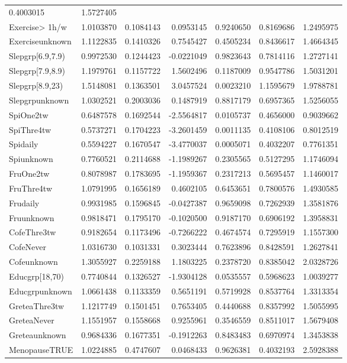 \documentclass[]{article}
\begin{document}
\begin{longtable}[]{@{}lrrrrrr@{}}
0.4003015 & 1.5727405\tabularnewline
Exercise\textgreater{} 1h/w & 1.0103870 & 0.1084143 & 0.0953145 &
0.9240650 & 0.8169686 & 1.2495975\tabularnewline
Exerciseunknown & 1.1122835 & 0.1410326 & 0.7545427 & 0.4505234 &
0.8436617 & 1.4664345\tabularnewline
Slepgrp{[}6.9,7.9) & 0.9972530 & 0.1244423 & -0.0221049 & 0.9823643 &
0.7814116 & 1.2727141\tabularnewline
Slepgrp{[}7.9,8.9) & 1.1979761 & 0.1157722 & 1.5602496 & 0.1187009 &
0.9547786 & 1.5031201\tabularnewline
Slepgrp{[}8.9,23) & 1.5148081 & 0.1363501 & 3.0457524 & 0.0023210 &
1.1595679 & 1.9788781\tabularnewline
Slepgrpunknown & 1.0302521 & 0.2003036 & 0.1487919 & 0.8817179 &
0.6957365 & 1.5256055\tabularnewline
SpiOne2tw & 0.6487578 & 0.1692544 & -2.5564817 & 0.0105737 & 0.4656000 &
0.9039662\tabularnewline
SpiThre4tw & 0.5737271 & 0.1704223 & -3.2601459 & 0.0011135 & 0.4108106
& 0.8012519\tabularnewline
Spidaily & 0.5594227 & 0.1670547 & -3.4770037 & 0.0005071 & 0.4032207 &
0.7761351\tabularnewline
Spiunknown & 0.7760521 & 0.2114688 & -1.1989267 & 0.2305565 & 0.5127295
& 1.1746094\tabularnewline
FruOne2tw & 0.8078987 & 0.1783695 & -1.1959367 & 0.2317213 & 0.5695457 &
1.1460017\tabularnewline
FruThre4tw & 1.0791995 & 0.1656189 & 0.4602105 & 0.6453651 & 0.7800576 &
1.4930585\tabularnewline
Frudaily & 0.9931985 & 0.1596845 & -0.0427387 & 0.9659098 & 0.7262939 &
1.3581876\tabularnewline
Fruunknown & 0.9818471 & 0.1795170 & -0.1020500 & 0.9187170 & 0.6906192
& 1.3958831\tabularnewline
CofeThre3tw & 0.9182654 & 0.1173496 & -0.7266222 & 0.4674574 & 0.7295919
& 1.1557300\tabularnewline
CofeNever & 1.0316730 & 0.1031331 & 0.3023444 & 0.7623896 & 0.8428591 &
1.2627841\tabularnewline
Cofeunknown & 1.3055927 & 0.2259188 & 1.1803225 & 0.2378720 & 0.8385042
& 2.0328726\tabularnewline
Educgrp{[}18,70) & 0.7740844 & 0.1326527 & -1.9304128 & 0.0535557 &
0.5968623 & 1.0039277\tabularnewline
Educgrpunknown & 1.0661438 & 0.1133359 & 0.5651191 & 0.5719928 &
0.8537764 & 1.3313354\tabularnewline
GreteaThre3tw & 1.1217749 & 0.1501451 & 0.7653405 & 0.4440688 &
0.8357992 & 1.5055995\tabularnewline
GreteaNever & 1.1551957 & 0.1558668 & 0.9255961 & 0.3546559 & 0.8511017
& 1.5679408\tabularnewline
Greteaunknown & 0.9684336 & 0.1677351 & -0.1912263 & 0.8483483 &
0.6970974 & 1.3453838\tabularnewline
MenopauseTRUE & 1.0224885 & 0.4747607 & 0.0468433 & 0.9626381 &
0.4032193 & 2.5928388\tabularnewline
\bottomrule
\end{longtable}
\end{document}
